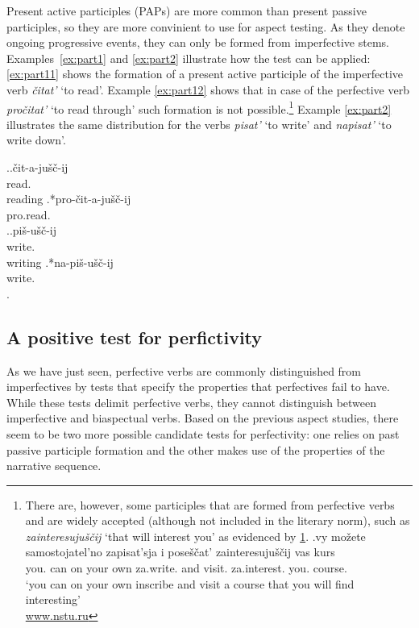 Present active participles  (PAPs) are more common than present passive participles, so they are more convinient to use for aspect testing. As they denote ongoing progressive events, they can only be formed from imperfective stems. Examples~\ref{ex:part1} and \ref{ex:part2} illustrate how the test can be applied: \ref{ex:part11} shows the formation of a present active participle of the imperfective verb \textit{\v{c}itat'} `to read'. Example \ref{ex:part12} shows that in case of the perfective verb \textit{pro\v{c}itat'} `to read through' such formation is not possible.\footnote{There are, however, some participles that are formed from perfective verbs and are widely accepted (although not included in the literary norm), such as \textit{zainteresuju\v{s}\v{c}ij} `that will interest you' as evidenced by \ref{ex:PFP}.
\exg.\label{ex:PFP}vy mo\v{z}ete samostojatel'no zapisat'sja i pose\v{s}\v{c}at' zainteresuju\v{s}\v{c}ij vas kurs\\
you. can {on your own} za.write. and visit. za.interest. you. course.\\
\trans `you can on your own inscribe and visit a course that you will find interesting'\\\hbox{} \hfill \hbox{\url{www.nstu.ru}}

} Example \ref{ex:part2} illustrates the same distribution for the verbs \textit{pisat'}\textsuperscript{\IPF} `to write' and \textit{napisat'}\textsuperscript{\PF} `to write down'.

\ex.\label{ex:part1}\ag.\label{ex:part11}\v{c}it-a-ju\v{s}\v{c}-ij\\
read\textsuperscript{\IPF}.\\
reading
\bg.\label{ex:part12}*pro-\v{c}it-a-ju\v{s}\v{c}-ij\\
pro.read\textsuperscript{\PF}.\\

\ex.\label{ex:part2}\ag.\label{ex:part21}pi\v{s}-u\v{s}\v{c}-ij\\
write\textsuperscript{\IPF}.\\
writing
\bg.\label{ex:part22}*na-pi\v{s}-u\v{s}\v{c}-ij\\
write\textsuperscript{\PF}.\\
\z.


\subsection{A positive test for perfictivity}\label{sec:tests:new}
As we have just seen, perfective verbs are commonly distinguished from imperfectives by tests that specify the properties that perfectives fail to have. While these tests delimit perfective verbs, they cannot distinguish between imperfective and biaspectual verbs. Based on the previous aspect studies, there seem to be two more possible candidate tests for perfectivity: one relies on past passive participle formation and the other makes use of the properties of the narrative sequence. %

